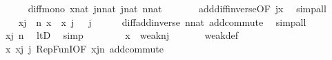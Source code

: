 \begin{isabellebody}
\ \ \ \ \isamarkupfalse%
\ diff{\isacharunderscore}{\kern0pt}mono\ {\isacartoucheopen}x{\isasymin}nat{\isacartoucheclose}\ {\isacartoucheopen}j{\isacharhash}{\kern0pt}{\isacharplus}{\kern0pt}n{\isasymin}nat{\isacartoucheclose}\ {\isacartoucheopen}j{\isasymin}nat{\isacartoucheclose}\ {\isacartoucheopen}n{\isasymin}nat{\isacartoucheclose}\ \isanewline
\ \ \ \ \ \ add{\isacharunderscore}{\kern0pt}diff{\isacharunderscore}{\kern0pt}inverse{\isacharbrackleft}{\kern0pt}OF\ {\isacartoucheopen}j{\isasymle}x{\isacartoucheclose}{\isacharbrackright}{\kern0pt}\ \isamarkupfalse%
\ simp{\isacharunderscore}{\kern0pt}all\isanewline
\ \ \isamarkupfalse%
\ \isanewline
\ \ \isamarkupfalse%
\ {\isachardoublequoteopen}x{\isacharhash}{\kern0pt}{\isacharminus}{\kern0pt}j\ {\isacharless}{\kern0pt}\ n{\isachardoublequoteclose}\ {\isachardoublequoteopen}x\ {\isacharequal}{\kern0pt}\ {\isacharparenleft}{\kern0pt}x\ {\isacharhash}{\kern0pt}{\isacharminus}{\kern0pt}j\ {\isacharparenright}{\kern0pt}\ {\isacharhash}{\kern0pt}{\isacharplus}{\kern0pt}\ j{\isachardoublequoteclose}\isanewline
\ \ \ \ \isamarkupfalse%
\ diff{\isacharunderscore}{\kern0pt}add{\isacharunderscore}{\kern0pt}inverse\ {\isacartoucheopen}n{\isasymin}nat{\isacartoucheclose}\ add{\isacharunderscore}{\kern0pt}commute\ \isamarkupfalse%
\ simp{\isacharunderscore}{\kern0pt}all\isanewline
\ \ \isamarkupfalse%
\ \isanewline
\ \ \isamarkupfalse%
\ {\isachardoublequoteopen}x{\isacharhash}{\kern0pt}{\isacharminus}{\kern0pt}j\ {\isasymin}n{\isachardoublequoteclose}\ \isamarkupfalse%
\ ltD\ \isamarkupfalse%
\ simp\isanewline
\ \ \isamarkupfalse%
\ \isanewline
\ \ \isamarkupfalse%
\ {\isachardoublequoteopen}x\ {\isasymin}\ weak{\isacharparenleft}{\kern0pt}n{\isacharcomma}{\kern0pt}j{\isacharparenright}{\kern0pt}{\isachardoublequoteclose}\ \isanewline
\ \ \ \ \isamarkupfalse%
\ weak{\isacharunderscore}{\kern0pt}def\isanewline
\ \ \ \ \isamarkupfalse%
\ {\isacartoucheopen}x{\isacharequal}{\kern0pt}\ {\isacharparenleft}{\kern0pt}x{\isacharhash}{\kern0pt}{\isacharminus}{\kern0pt}j{\isacharparenright}{\kern0pt}\ {\isacharhash}{\kern0pt}{\isacharplus}{\kern0pt}j{\isacartoucheclose}\ RepFunI{\isacharbrackleft}{\kern0pt}OF\ {\isacartoucheopen}x{\isacharhash}{\kern0pt}{\isacharminus}{\kern0pt}j{\isasymin}n{\isacartoucheclose}{\isacharbrackright}{\kern0pt}\ add{\isacharunderscore}{\kern0pt}commute\ \isamarkupfalse%

\end{isabellebody}
